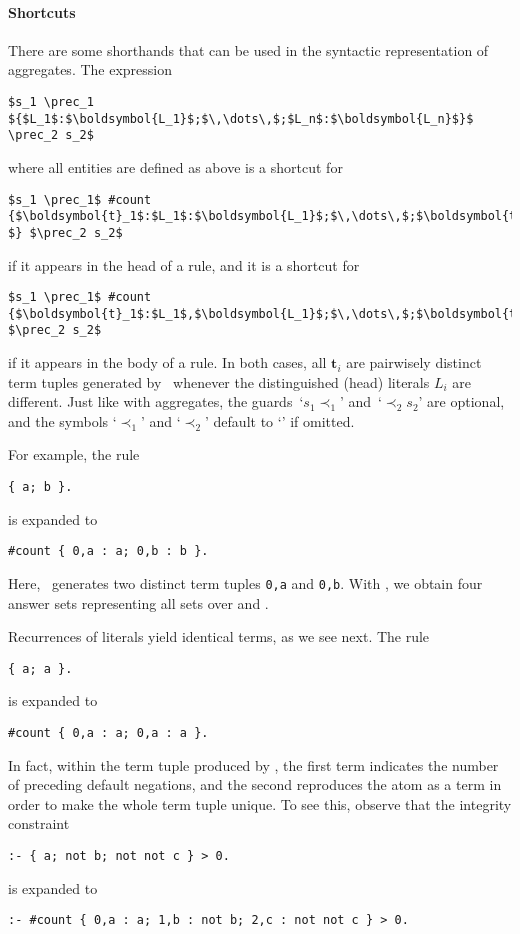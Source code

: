 \paragraph{Shortcuts}
There are some shorthands that can be used in the syntactic representation of aggregates.
%
The expression
%
\begin{lstlisting}[numbers=none,mathescape]
$s_1 \prec_1 ${$L_1$:$\boldsymbol{L_1}$;$\,\dots\,$;$L_n$:$\boldsymbol{L_n}$}$ \prec_2 s_2$
\end{lstlisting}
%
where all entities are defined as above
is a shortcut for
%
\begin{lstlisting}[numbers=none,mathescape]
$s_1 \prec_1$ #count {$\boldsymbol{t}_1$:$L_1$:$\boldsymbol{L_1}$;$\,\dots\,$;$\boldsymbol{t}_n$:$L_n$:$\boldsymbol{L_n} $} $\prec_2 s_2$
\end{lstlisting}
%
if it appears in the head of a rule, and
it is a shortcut for
%
\begin{lstlisting}[numbers=none,mathescape]
$s_1 \prec_1$ #count {$\boldsymbol{t}_1$:$L_1$,$\boldsymbol{L_1}$;$\,\dots\,$;$\boldsymbol{t}_n$:$L_n$,$\boldsymbol{L_n}$} $\prec_2 s_2$
\end{lstlisting}
%
if it appears in the body of a rule.
In both cases, all $\boldsymbol{t}_i$ are pairwisely distinct term tuples generated by \gringo\
whenever the distinguished (head) literals $L_i$ are different.
%
Just like with aggregates, the guards~`$s_1\prec_1$' and~`$\prec_2 s_2$' are optional, and the symbols `$\prec_1$' and `$\prec_2$' default to `\code{<=}' if omitted.

For example, the rule
\begin{lstlisting}[numbers=none]
{ a; b }.
\end{lstlisting}
is expanded to
\begin{lstlisting}[numbers=none]
#count { 0,a : a; 0,b : b }.
\end{lstlisting}
Here, \gringo\ generates two distinct term tuples \lstinline{0,a} and \lstinline{0,b}.
With \clingo, we obtain four answer sets representing all sets over \code{a} and .

Recurrences of literals yield identical terms, as we see next.
The rule
\begin{lstlisting}[numbers=none]
{ a; a }.
\end{lstlisting}
is expanded to
\begin{lstlisting}[numbers=none]
#count { 0,a : a; 0,a : a }.
\end{lstlisting}

In fact, within the term tuple produced by \gringo,
the first term indicates the number of preceding default negations,
and the second reproduces the atom as a term in order to make the whole term tuple unique.
%
To see this, observe that the integrity constraint
\begin{lstlisting}[numbers=none]
:- { a; not b; not not c } > 0.
\end{lstlisting}
is expanded to
\begin{lstlisting}[numbers=none]
:- #count { 0,a : a; 1,b : not b; 2,c : not not c } > 0.
\end{lstlisting}

